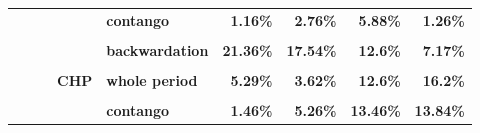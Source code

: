 \documentclass[
  authoryear,
  preprint,
  3p]{elsarticle}
\begin{document}
\begin{landscape}
\begin{longtable}[t]{>{}l>{}l>{}l>{}l>{}l>{}r>{}r>{}r>{}r}
\textbf{} & \textbf{} & \textbf{} & \textbf{} & \textbf{contango} & \textcolor[HTML]{4285f4}{\textbf{1.16\%}} & \textcolor[HTML]{4285f4}{\textbf{2.76\%}} & \textcolor[HTML]{4285f4}{\textbf{5.88\%}} & \textcolor[HTML]{4285f4}{\textbf{1.26\%}}\\
\textbf{\cellcolor{gray!10}{}} & \textbf{\cellcolor{gray!10}{}} & \textbf{\cellcolor{gray!10}{gas}} & \textbf{\cellcolor{gray!10}{market}} & \textbf{\cellcolor{gray!10}{whole period}} & \textcolor[HTML]{4285f4}{\textbf{\cellcolor{gray!10}{19.37\%}}} & \textcolor[HTML]{4285f4}{\textbf{\cellcolor{gray!10}{18.38\%}}} & \textcolor[HTML]{4285f4}{\textbf{\cellcolor{gray!10}{10.88\%}}} & \textcolor[HTML]{4285f4}{\textbf{\cellcolor{gray!10}{7.86\%}}}\\
\addlinespace
\textbf{} & \textbf{} & \textbf{} & \textbf{} & \textbf{backwardation} & \textcolor[HTML]{4285f4}{\textbf{21.36\%}} & \textcolor[HTML]{4285f4}{\textbf{17.54\%}} & \textcolor[HTML]{4285f4}{\textbf{12.6\%}} & \textcolor[HTML]{4285f4}{\textbf{7.17\%}}\\
\textbf{\cellcolor{gray!10}{}} & \textbf{\cellcolor{gray!10}{}} & \textbf{\cellcolor{gray!10}{}} & \textbf{\cellcolor{gray!10}{}} & \textbf{\cellcolor{gray!10}{contango}} & \textcolor[HTML]{4285f4}{\textbf{\cellcolor{gray!10}{17.12\%}}} & \textcolor[HTML]{4285f4}{\textbf{\cellcolor{gray!10}{20.07\%}}} & \textcolor[HTML]{4285f4}{\textbf{\cellcolor{gray!10}{9.92\%}}} & \textcolor[HTML]{4285f4}{\textbf{\cellcolor{gray!10}{7.96\%}}}\\
\textbf{} & \textbf{} & \textbf{} & \textbf{CHP} & \textbf{whole period} & \textcolor[HTML]{4285f4}{\textbf{5.29\%}} & \textcolor[HTML]{4285f4}{\textbf{3.62\%}} & \textcolor[HTML]{4285f4}{\textbf{12.6\%}} & \textcolor[HTML]{4285f4}{\textbf{16.2\%}}\\
\textbf{\cellcolor{gray!10}{}} & \textbf{\cellcolor{gray!10}{}} & \textbf{\cellcolor{gray!10}{}} & \textbf{\cellcolor{gray!10}{}} & \textbf{\cellcolor{gray!10}{backwardation}} & \textcolor[HTML]{4285f4}{\textbf{\cellcolor{gray!10}{10.16\%}}} & \textcolor[HTML]{4285f4}{\textbf{\cellcolor{gray!10}{2.14\%}}} & \textcolor[HTML]{4285f4}{\textbf{\cellcolor{gray!10}{11.42\%}}} & \textcolor[HTML]{4285f4}{\textbf{\cellcolor{gray!10}{19.3\%}}}\\
\textbf{} & \textbf{} & \textbf{} & \textbf{} & \textbf{contango} & \textcolor[HTML]{4285f4}{\textbf{1.46\%}} & \textcolor[HTML]{4285f4}{\textbf{5.26\%}} & \textcolor[HTML]{4285f4}{\textbf{13.46\%}} & \textcolor[HTML]{4285f4}{\textbf{13.84\%}}\\

\end{longtable}
\end{landscape}
\end{document}
